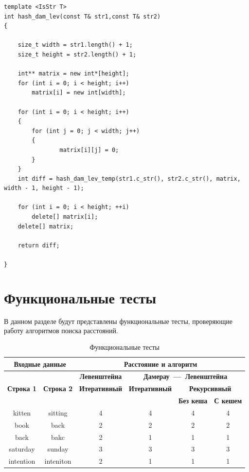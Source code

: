 \begin{lstlisting}[caption=Рекурсивный алгоритм поиска расстояния Дамерау~---~Левенштейна с кэшированием (оберточная функция)]
template <IsStr T>
int hash_dam_lev(const T& str1,const T& str2)
{

    size_t width = str1.length() + 1;
    size_t height = str2.length() + 1;

    int** matrix = new int*[height];
    for (int i = 0; i < height; i++)
        matrix[i] = new int[width];

    for (int i = 0; i < height; i++)
    {
        for (int j = 0; j < width; j++)
        {
                matrix[i][j] = 0;
        }
    }
    int diff = hash_dam_lev_temp(str1.c_str(), str2.c_str(), matrix, width - 1, height - 1);

    for (int i = 0; i < height; ++i)
        delete[] matrix[i];    
    delete[] matrix;

    return diff;

}
\end{lstlisting}
\clearpage
\section{Функциональные тесты}

В данном разделе будут представлены функциональные тесты, проверяющие работу алгоритмов поиска расстояний.

\begin{table}[ht]\centering
	\small
	\begin{center}
		\begin{threeparttable}
		\caption{Функциональные тесты}
		\label{tbl:func_tests}
		\begin{tabular}{|c|c|c|c|c|c|}
			\hline
			\multicolumn{2}{|c|}{\bfseries Входные данные}
			& \multicolumn{4}{c|}{\bfseries Расстояние и алгоритм} \\ 
			\hline 
			&
			& \multicolumn{1}{c|}{\bfseries Левенштейна} 
			& \multicolumn{3}{c|}{\bfseries Дамерау~---~Левенштейна} \\ \cline{3-6}
			
			\bfseries Строка 1 & \bfseries Строка 2 & \bfseries Итеративный & \bfseries Итеративный
			
			& \multicolumn{2}{c|}{\bfseries Рекурсивный} \\ \cline{5-6}
			& & & & \bfseries Без кеша & \bfseries С кешем \\
			\hline
			kitten & sitting & 4 & 4 & 4 & 4 \\
			\hline
			book & back & 2 & 2 & 2 & 2 \\
			\hline
			back & bakc & 2 & 1 & 1 & 1 \\
			\hline
			saturday & sunday & 3 & 3 & 3 & 3 \\
			\hline
			intention & inteniton & 2 & 1 & 1 & 1 \\
			\hline
		\end{tabular}	
		\end{threeparttable}
	\end{center}
\end{table}

